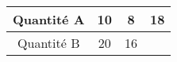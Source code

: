 \begin{tabular}{|c|c|c|c|}
\hline
Quantité A & 10 & 8 & 18 \\ \hline
Quantité B & 20 & 16 & \kern1cm \\ \hline
\end{tabular}


